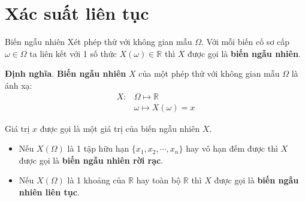 \documentclass[aspectratio=169,xcolor=dvipsnames,serif]{beamer}
\begin{document}
\section{Xác suất liên tục}

\begin{frame}{Biến ngẫu nhiên}
    Xét phép thử với không gian mẫu $\Omega$. Với mỗi biến cố sơ cấp $\omega \in \Omega$ ta liên kết với 1 số thức $X(\omega)\in\mathbb{R}$ thì $X$ được gọi là \textbf{biến ngẫu nhiên}.
    
    \textbf{Định nghĩa}. \textbf{Biến ngẫu nhiên} $X$ của một phép thử với không gian mẫu $\Omega$ là ánh xạ: 
    \begin{equation*}
        \begin{split}
            X: & \Omega \mapsto \mathbb{R} \\ & \omega \mapsto X(\omega) = x
        \end{split}
    \end{equation*}
    
    Giá trị $x$ được gọi là một giá trị của biến ngẫu nhiên $X$.
    
    \begin{itemize}
        \item Nếu $X(\Omega)$ là 1 tập hữu hạn $\{x_1, x_2, \cdots, x_n\}$ hay vô hạn đếm được thì $X$ được gọi là \textbf{biến ngẫu nhiên rời rạc}.
        \item Nếu $X(\Omega)$ là 1 khoảng của $\mathbb{R}$ hay toàn bộ $\mathbb{R}$ thì $X$ được gọi là \textbf{biến ngẫu nhiên liên tục}.
    \end{itemize}
\end{frame}
\end{document}
